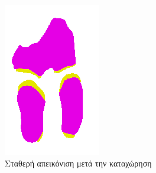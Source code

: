 \documentclass[a4paper,12pt]{article}
\begin{document}
\begin{figure}[H]
    \centering

    \begin{subfigure}[t]{0.4\linewidth}
    \includegraphics[width=\linewidth]{original_label_registration_2.png}
    \caption{Σταθερή απεικόνιση μετά την καταχώρηση}
    \end{subfigure}
    \begin{subfigure}[t]{0.4\linewidth}

\end{subfigure}
\end{figure}
\end{document}
